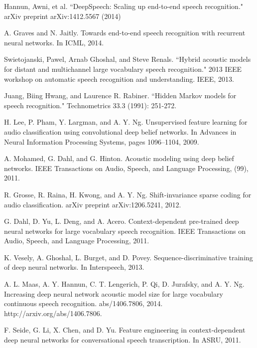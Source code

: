 \documentclass[12pt]{article}
\begin{document}
\newpage
\begin{thebibliography}{8}
    Hannun, Awni, et al. ``DeepSpeech: Scaling up end-to-end speech recognition." arXiv preprint arXiv:1412.5567 (2014)

    A. Graves and N. Jaitly. Towards end-to-end speech recognition with recurrent neural networks. In ICML, 2014.

    Swietojanski, Pawel, Arnab Ghoshal, and Steve Renals. ``Hybrid acoustic models for distant and multichannel large vocabulary speech recognition." 2013 IEEE workshop on automatic speech recognition and understanding. IEEE, 2013.

    Juang, Biing Hwang, and Laurence R. Rabiner. ``Hidden Markov models for speech recognition." Technometrics 33.3 (1991): 251-272.

    H. Lee, P. Pham, Y. Largman, and A. Y. Ng. Unsupervised feature learning for audio classification using convolutional deep belief networks. In Advances in Neural Information Processing
    Systems, pages 1096–1104, 2009.

    A. Mohamed, G. Dahl, and G. Hinton. Acoustic modeling using deep belief networks. IEEE
    Transactions on Audio, Speech, and Language Processing, (99), 2011.

    R. Grosse, R. Raina, H. Kwong, and A. Y. Ng. Shift-invariance sparse coding for audio classification. arXiv preprint arXiv:1206.5241, 2012.

    G. Dahl, D. Yu, L. Deng, and A. Acero. Context-dependent pre-trained deep neural networks
    for large vocabulary speech recognition. IEEE Transactions on Audio, Speech, and Language
    Processing, 2011.


    K. Vesely, A. Ghoshal, L. Burget, and D. Povey. Sequence-discriminative training of deep
    neural networks. In Interspeech, 2013.

    A. L. Maas, A. Y. Hannun, C. T. Lengerich, P. Qi, D. Jurafsky, and A. Y. Ng. Increasing
    deep neural network acoustic model size for large vocabulary continuous speech recognition.
    abs/1406.7806, 2014. http://arxiv.org/abs/1406.7806.


    F. Seide, G. Li, X. Chen, and D. Yu. Feature engineering in context-dependent deep neural
    networks for conversational speech transcription. In ASRU, 2011.


\end{thebibliography}
\end{document}
